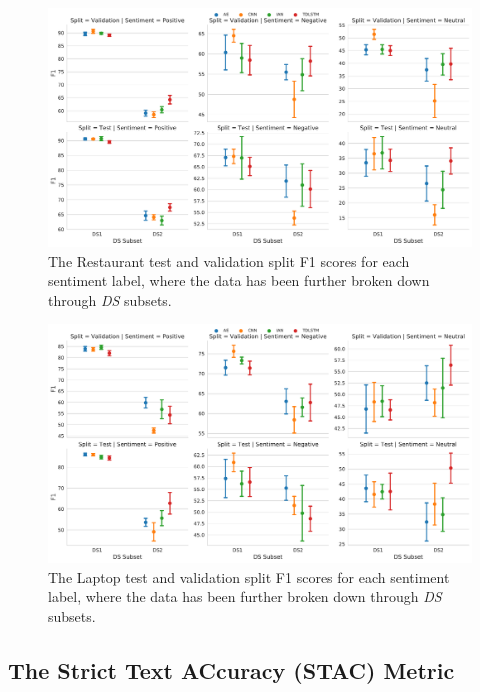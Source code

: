 \begin{figure}[h!]
    \centering
    \includegraphics[scale=0.38]{images/augmentation/methods_performance/baseline/sentiment_f1_ds_restaurant.pdf}
    \caption{The Restaurant test and validation split F1 scores for each sentiment label, where the data has been further broken down through \textit{DS} subsets.}
    \label{fig:aug_baseline_sentiment_f1_ds_restaurant}
\end{figure}
\begin{figure}[h!]
    \centering
    \includegraphics[scale=0.38]{images/augmentation/methods_performance/baseline/sentiment_f1_ds_laptop.pdf}
    \caption{The Laptop test and validation split F1 scores for each sentiment label, where the data has been further broken down through \textit{DS} subsets.}
    \label{fig:aug_baseline_sentiment_f1_ds_laptop}
\end{figure}

\FloatBarrier
\subsection{The Strict Text ACcuracy (STAC) Metric}
\label{section:augmentation_cwr_STAC_new}

